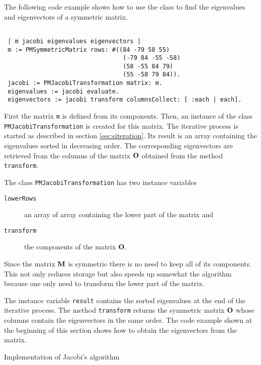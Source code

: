 \documentclass[twoside]{book}
\begin{document}
The following code example shows how to use the class to find the
eigenvalues and eigenvectors of a symmetric matrix.
\begin{codeExample}
\begin{verbatim}

 | m jacobi eigenvalues eigenvectors |
 m := PMSymmetricMatrix rows: #((84 -79 58 55)
                                 (-79 84 -55 -58)
                                 (58 -55 84 79)
                                 (55 -58 79 84)).
 jacobi := PMJacobiTransformation matrix: m.
 eigenvalues := jacobi evaluate.
 eigenvectors := jacobi transform columnsCollect: [ :each | each].
\end{verbatim}
\end{codeExample}
First the matrix {\tt m} is defined from its components. Then, an
instance of the class {\tt PMJacobiTransformation} is created for
this matrix. The iterative process is started as described in
section \ref{sec:siteration}. Its result is an array containing
the eigenvalues sorted in decreasing order. The corresponding
eigenvectors are retrieved from the columns of the matrix ${\bf
O}$ obtained from the method {\tt transform}.

The class {\tt PMJacobiTransformation} has two instance variables
\begin{description}
  \item[\tt lowerRows] an array of array containing the lower part
  of the matrix and
  \item[\tt transform] the components of the matrix ${\bf O}$.
\end{description}
Since the matrix ${\bf M}$ is symmetric there is no need to keep
all of its components. This not only reduces storage but also
speeds up somewhat the algorithm because one only need to
transform the lower part of the matrix.


The instance variable {\tt result} contains the sorted eigenvalues
at the end of the iterative process. The method {\tt transform}
returns the symmetric matrix ${\bf O}$ whose columns contain the
eigenvectors in the same order. The code example shown at the
beginning of this section shows how to obtain the eigenvectors
from the matrix.

\begin{listing} Implementation of Jacobi's algorithm \label{ls:jacobi}

\end{listing}

\ifx\wholebook\relax\else
\end{document}
